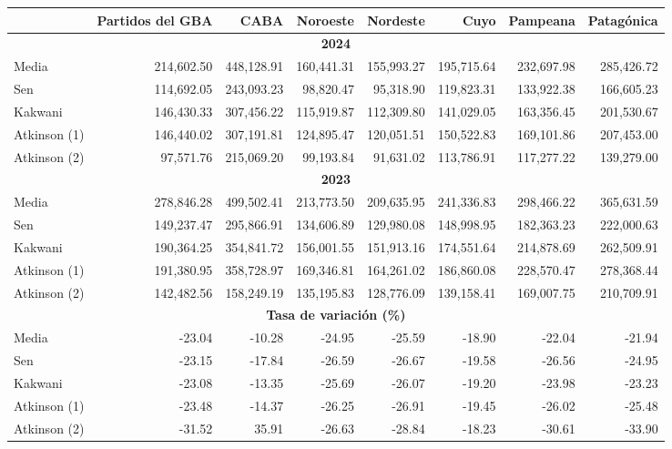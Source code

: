 \begin{tabular}{lrrrrrrr}
\hline
\textbf{} & \textbf{Partidos del GBA} & \textbf{CABA} & \textbf{Noroeste} & \textbf{Nordeste} & \textbf{Cuyo} & \textbf{Pampeana} & \textbf{Patagónica} \\
\hline
\multicolumn{8}{c}{\textbf{2024}} \\
Media        & 214,602.50 & 448,128.91 & 160,441.31 & 155,993.27 & 195,715.64 & 232,697.98 & 285,426.72 \\
Sen          & 114,692.05 & 243,093.23 & 98,820.47  & 95,318.90  & 119,823.31 & 133,922.38 & 166,605.23 \\
Kakwani      & 146,430.33 & 307,456.22 & 115,919.87 & 112,309.80 & 141,029.05 & 163,356.45 & 201,530.67 \\
Atkinson (1) & 146,440.02 & 307,191.81 & 124,895.47 & 120,051.51 & 150,522.83 & 169,101.86 & 207,453.00 \\
Atkinson (2) & 97,571.76  & 215,069.20 & 99,193.84  & 91,631.02  & 113,786.91 & 117,277.22 & 139,279.00 \\
\hline
\multicolumn{8}{c}{\textbf{2023}} \\
Media        & 278,846.28 & 499,502.41 & 213,773.50 & 209,635.95 & 241,336.83 & 298,466.22 & 365,631.59 \\
Sen          & 149,237.47 & 295,866.91 & 134,606.89 & 129,980.08 & 148,998.95 & 182,363.23 & 222,000.63 \\
Kakwani      & 190,364.25 & 354,841.72 & 156,001.55 & 151,913.16 & 174,551.64 & 214,878.69 & 262,509.91 \\
Atkinson (1) & 191,380.95 & 358,728.97 & 169,346.81 & 164,261.02 & 186,860.08 & 228,570.47 & 278,368.44 \\
Atkinson (2) & 142,482.56 & 158,249.19 & 135,195.83 & 128,776.09 & 139,158.41 & 169,007.75 & 210,709.91 \\
\hline
\multicolumn{8}{c}{\textbf{Tasa de variación (\%)}} \\
Media        & -23.04     & -10.28     & -24.95     & -25.59     & -18.90     & -22.04     & -21.94     \\
Sen          & -23.15     & -17.84     & -26.59     & -26.67     & -19.58     & -26.56     & -24.95     \\
Kakwani      & -23.08     & -13.35     & -25.69     & -26.07     & -19.20     & -23.98     & -23.23     \\
Atkinson (1) & -23.48     & -14.37     & -26.25     & -26.91     & -19.45     & -26.02     & -25.48     \\
Atkinson (2) & -31.52     & 35.91      & -26.63     & -28.84     & -18.23     & -30.61     & -33.90     \\
\hline
\end{tabular}